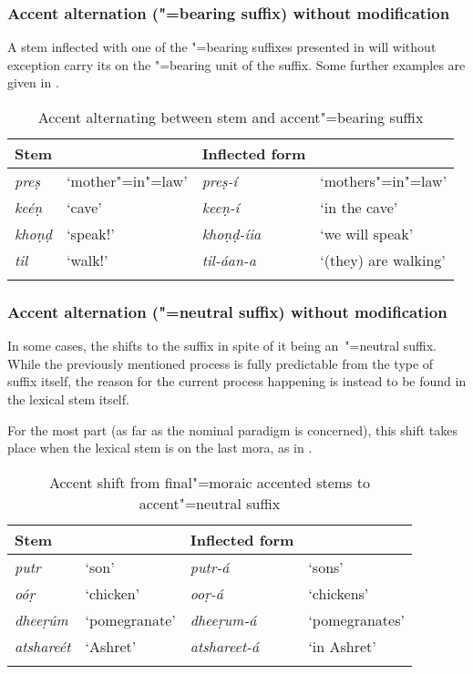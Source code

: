 \subsubsection*{Accent alternation ("=bearing suffix) without modification}

A stem inflected with one of the "=bearing suffixes presented in  will without
exception carry its  on the "=bearing unit of the suffix. Some further examples are given in .


\begin{table}[h]
\caption{ Accent alternating between stem and {accent}"=bearing suffix}
\begin{tabularx}{\textwidth}{ l@{\hspace{25pt}} Q l@{\hspace{25pt}} Q }
\lsptoprule
Stem &
&
Inflected form &
\\\midrule
\textit{preṣ} &
`mother"=in"=law' &
\textit{preṣ-í} &
`mothers"=in"=law'\\
\textit{keéṇ} &
`cave' &
\textit{keeṇ-í} &
`in the cave'\\
\textit{khoṇḍ} &
`speak!' &
\textit{khoṇḍ-íia} &
`we will speak'\\
\textit{til} &
`walk!' &
\textit{til-áan-a} &
`(they) are walking'\\\lspbottomrule
\end{tabularx}
\label{tab:3-8}
\end{table}

\subsubsection*{Accent alternation ("=neutral suffix) without modification}

In some cases, the  shifts to the suffix in spite of it being an~"=neutral suffix. While
the previously mentioned process is fully predictable from the type of suffix itself, the reason for
the current process happening is instead to be found in the lexical stem itself.


For the most part (as far as the nominal paradigm is concerned), this shift takes place when the
lexical stem  is on the last mora, as in .



\begin{table}[p] 
\caption{ Accent shift from final"=moraic accented stems to {accent}"=neutral suffix}
\begin{tabularx}{\textwidth}{XXXX}
\lsptoprule
Stem &
&
Inflected form &
\\\midrule
\textit{putr} &
`son' &
\textit{putr-á} &
`sons'\\
\textit{oóṛ} &
`chicken' &
\textit{ooṛ-á} &
`chickens'\\
\textit{dheeṛúm} &
`pomegranate' &
\textit{dheeṛum-á} &
`pomegranates'\\
\textit{atshareét} &
`Ashret' &
\textit{atshareet-á} &
`in Ashret'\\\lspbottomrule
\end{tabularx}
\label{tab:3-9}
\end{table}


